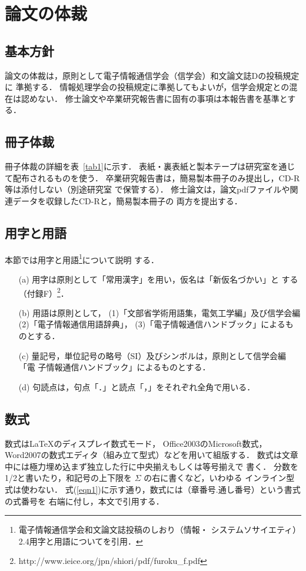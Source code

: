 \documentclass[main]{subfiles}
\begin{document}
\chapter{論文の体裁}
\section{基本方針}
論文の体裁は，原則として電子情報通信学会（信学会）和文論文誌Dの投稿規定に
準拠する．
情報処理学会の投稿規定に準拠してもよいが，信学会規定との混在は認めない．
修士論文や卒業研究報告書に固有の事項は本報告書を基準とする．

\section{冊子体裁}
冊子体裁の詳細を表~\ref{tab1}に示す．
表紙・裏表紙と製本テープは研究室を通じて配布されるものを使う．
卒業研究報告書は，簡易製本冊子のみ提出し，CD-R等は添付しない（別途研究室
で保管する）．
修士論文は，論文pdfファイルや関連データを収録したCD-Rと，簡易製本冊子の
両方を提出する．



\section{用字と用語}
本節では用字と用語\footnote{電子情報通信学会和文論文誌投稿のしおり（情報・
	システムソサイエティ） 2.4用字と用語についてを引用．}について説明
	する．


\begin{itemize}
\item[(a)] 用字は原則として「常用漢字」を用い，仮名は「新仮名づかい」と
	   する（付録F）\footnote{http://www.ieice.org/jpn/shiori/pdf/furoku\_f.pdf}．
\item[(b)] 用語は原則として，
(1)「文部省学術用語集，電気工学編」及び信学会編
(2)「電子情報通信用語辞典」，
(3)「電子情報通信ハンドブック」によるものとする．
\item[(c)] 量記号，単位記号の略号（SI）及びシンボルは，原則として信学会編「電
      子情報通信ハンドブック」によるものとする．
\item[(d)] 句読点は，句点「．」と読点「，」をそれぞれ全角で用いる．
\end{itemize}


\section{数式}
数式は\LaTeX のディスプレイ数式モード， Office2003のMicrosoft数式，
Word2007の数式エディタ（組み立て型式）などを用いて組版する．
数式は文章中には極力埋め込まず独立した行に中央揃えもしくは等号揃えで
書く．
分数を1/2と書いたり，和記号の上下限を $\Sigma$ の右に書くなど，いわゆる
インライン型式は使わない．
式(\ref{eqn1})に示す通り，数式には（章番号.通し番号）という書式の式番号を
右端に付し，本文で引用する．
\end{document}
